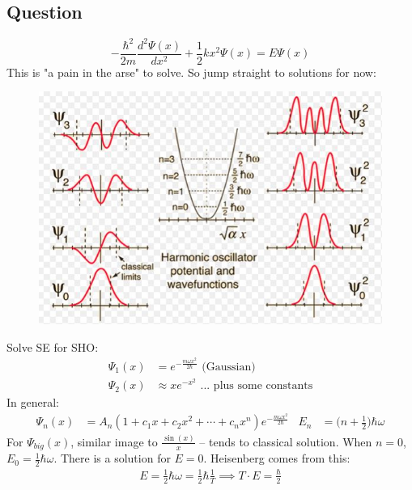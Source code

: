 \documentclass[a4paper, 11pt, normalem]{report}
\begin{document}
\subsection{Question}
\begin{equation}
    -\frac{\hbar^{2}}{2m}\frac{d^{2}\Psi(x)}{dx^{2}} + \frac{1}{2}kx^{2}\Psi(x) = E\Psi(x)
\end{equation}
This is "a pain in the arse" to solve.
So jump straight to solutions for now:
\begin{figure}[H]
    \centering
    \includegraphics{HarmOsc.jpg}
\end{figure}
Solve SE for SHO:
\begin{align}
    \Psi_{1}(x) &= e^{-\tfrac{m\omega x^{2}}{2\hbar}}\text{ (Gaussian)} \\
    \Psi_{2}(x) &\approx xe^{-x^{2}}\text{ ... plus some constants}
\end{align}
In general:
\begin{align}
    \Psi_{n}(x) &= A_{n}(1 + c_{1}x + c_{2}x^{2} + \cdots + c_{n}x^{n})e^{-\tfrac{m\omega x^{2}}{2\hbar}} & E_{n} &= \bigg(n + \frac{1}{2}\bigg)\hbar\omega
\end{align}
For $\Psi_{big}(x)$, similar image to $\frac{\sin(x)}{x}$ -- tends to classical solution.
When $n = 0$, $E_{0} = \frac{1}{2}\hbar\omega$.
There is a solution for $E = 0$.
Heisenberg comes from this:
\begin{align}
    E = \frac{1}{2}\hbar\omega = \frac{1}{2}\hbar\frac{1}{T} \implies T\cdot E = \frac{\hbar}{2}
\end{align}
\end{document}
